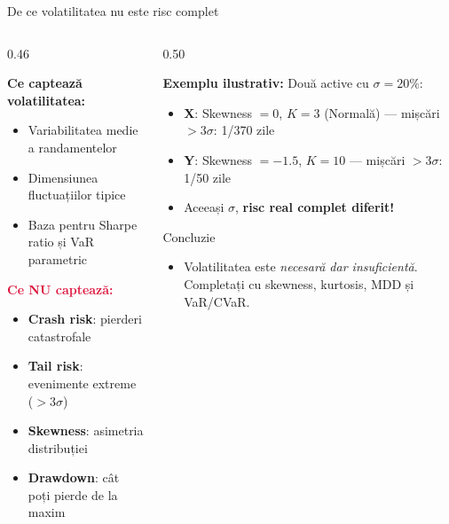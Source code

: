 \documentclass[9pt, aspectratio=169, t]{beamer}
\theoremstyle{definition}
\begin{document}
\begin{frame}{De ce volatilitatea nu este risc complet}
\begin{columns}[T]
\begin{column}{0.46\textwidth}
{\footnotesize
\textbf{Ce captează volatilitatea:}
\begin{itemize}\setlength{\itemsep}{0pt}
    \item Variabilitatea medie a randamentelor
    \item Dimensiunea fluctuațiilor tipice
    \item Baza pentru Sharpe ratio și VaR parametric
\end{itemize}
\vspace{0.1cm}
\textbf{\textcolor{Crimson}{Ce NU captează:}}
\begin{itemize}\setlength{\itemsep}{0pt}
    \item \textbf{Crash risk}: pierderi catastrofale
    \item \textbf{Tail risk}: evenimente extreme ($>3\sigma$)
    \item \textbf{Skewness}: asimetria distribuției
    \item \textbf{Drawdown}: cât poți pierde de la maxim
\end{itemize}
}
\end{column}
\begin{column}{0.50\textwidth}
{\footnotesize
\textbf{Exemplu ilustrativ:} Două active cu $\sigma = 20\%$:
\begin{itemize}\setlength{\itemsep}{0pt}
    \item \textbf{X}: Skewness $= 0$, $K = 3$ (Normală) --- mișcări $>3\sigma$: 1/370 zile
    \item \textbf{Y}: Skewness $= -1.5$, $K = 10$ --- mișcări $>3\sigma$: 1/50 zile
    \item Aceeași $\sigma$, \textbf{risc real complet diferit!}
\end{itemize}
}
\vspace{0.1cm}
\begin{block}{Concluzie}
\begin{itemize}
\item {\small Volatilitatea este \textit{necesară dar insuficientă}. Completați cu skewness, kurtosis, MDD și VaR/CVaR.}
\end{itemize}
\end{block}
\end{column}
\end{columns}
\end{frame}
\end{document}
